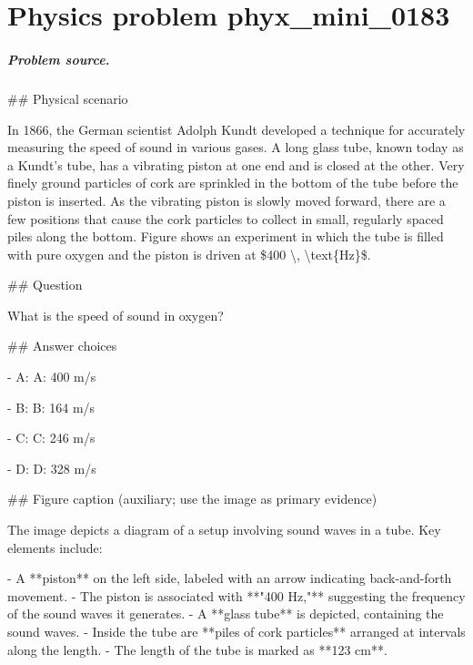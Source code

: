 
\chapter{Physics problem phyx\_mini\_0183}
\label{ch:PhyXMiniProblems_problem_phyx_mini_0183}

\paragraph{Problem source.}
\#\# Physical scenario

In 1866, the German scientist Adolph Kundt developed a technique for accurately measuring the speed of sound in various gases. A long glass tube, known today as a Kundt's tube, has a vibrating piston at one end and is closed at the other. Very finely ground particles of cork are sprinkled in the bottom of the tube before the piston is inserted. As the vibrating piston is slowly moved forward, there are a few positions that cause the cork particles to collect in small, regularly spaced piles along the bottom. Figure shows an experiment in which the tube is filled with pure oxygen and the piston is driven at \$400 \textbackslash{}, \textbackslash{}text\{Hz\}\$.

\#\# Question

What is the speed of sound in oxygen?

\#\# Answer choices

- A: A: 400 m/s

- B: B: 164 m/s

- C: C: 246 m/s

- D: D: 328 m/s

\#\# Figure caption (auxiliary; use the image as primary evidence)

The image depicts a diagram of a setup involving sound waves in a tube. Key elements include:

- A **piston** on the left side, labeled with an arrow indicating back-and-forth movement.
- The piston is associated with **"400 Hz,"** suggesting the frequency of the sound waves it generates.
- A **glass tube** is depicted, containing the sound waves.
- Inside the tube are **piles of cork particles** arranged at intervals along the length.
- The length of the tube is marked as **123 cm**.

